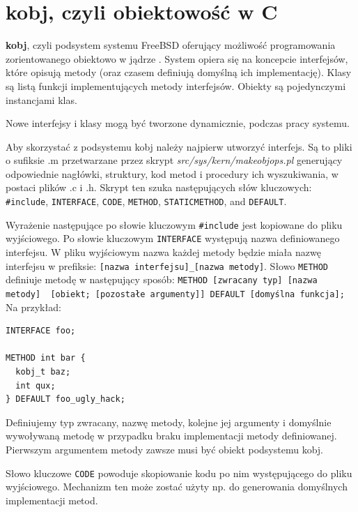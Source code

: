 \documentclass[shortabstract,inz]{iithesis}
\begin{document}
\section{kobj, czyli obiektowość w C} %

\textbf{kobj}, czyli podsystem systemu FreeBSD oferujący możliwość programowania
zorientowanego obiektowo w jądrze \cite{man:kobj_9}\cite{kobj_jake}\cite{freebsd_handbook_kobj}. System opiera się na koncepcie interfejsów,
które opisują metody (oraz czasem definiują domyślną ich implementację). Klasy są listą
funkcji implementujących metody interfejsów. Obiekty są pojedynczymi instancjami
klas.

Nowe interfejsy i klasy mogą być tworzone dynamicznie, podczas pracy systemu.

Aby skorzystać z podsystemu kobj należy najpierw utworzyć interfejs.
Są to pliki o sufiksie .m przetwarzane przez skrypt \textit{src/sys/kern/makeobjops.pl}
generujący odpowiednie nagłówki, struktury, kod metod i procedury ich wyszukiwania, w 
postaci plików .c i .h.
Skrypt ten szuka następujących słów kluczowych: \texttt{\#include}, \texttt{INTERFACE}, \texttt{CODE}, \texttt{METHOD}, 
\texttt{STATICMETHOD}, and \texttt{DEFAULT}.

Wyrażenie następujące po słowie kluczowym \texttt{\#include} jest kopiowane do pliku wyjściowego.
Po słowie kluczowym \texttt{INTERFACE} występują nazwa definiowanego interfejsu. 
W pliku wyjściowym nazwa każdej metody będzie miała nazwę interfejsu w 
prefiksie: \texttt{[nazwa interfejsu]\_[nazwa metody]}.
Słowo \texttt{METHOD} definiuje metodę w następujący sposób: 
\texttt{METHOD [zwracany typ] [nazwa metody] { [obiekt; [pozostałe argumenty]] }DEFAULT [domyślna funkcja];}
Na przykład:

\begin{lstlisting}
INTERFACE foo;

METHOD int bar {
  kobj_t baz;
  int qux;
} DEFAULT foo_ugly_hack;
\end{lstlisting}

Definiujemy typ zwracany, nazwę metody, kolejne jej argumenty i domyślnie wywoływaną
metodę w przypadku braku implementacji metody definiowanej. Pierwszym argumentem
metody zawsze musi być obiekt podsystemu kobj.

Słowo kluczowe \texttt{CODE} powoduje skopiowanie kodu po nim występującego do pliku wyjściowego.
Mechanizm ten może zostać użyty np. do generowania domyślnych implementacji metod.
\end{document}
